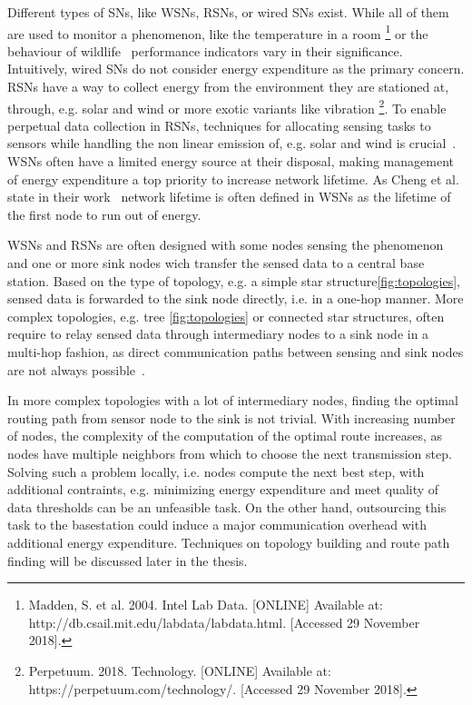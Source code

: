 Different types of \acp{SN}, like \acp{WSN}, \acp{RSN}, or wired \acp{SN} exist. 
While all of them are used to monitor a phenomenon, like the temperature in a room \footnote{Madden, S. et al. 2004. Intel Lab Data. [ONLINE] Available at: http://db.csail.mit.edu/labdata/labdata.html. [Accessed 29 November 2018].} or the behaviour of wildlife~\cite{bennett2011cranetracker} performance indicators vary in their significance. 
Intuitively, wired \acp{SN} do not consider energy expenditure as the primary concern. 
\acp{RSN} have a way to collect energy from the environment they are stationed at, through, e.g. solar and wind or more exotic variants like vibration \footnote{Perpetuum. 2018. Technology. 
[ONLINE] Available at: https://perpetuum.com/technology/. [Accessed 29 November 2018].}. 
To enable perpetual data collection in \acp{RSN}, techniques for allocating sensing tasks to sensors while handling the non linear emission of, e.g. solar and wind is crucial~\cite{liu2011perpetual}. 
\acp{WSN} often have a limited energy source at their disposal, making management of energy expenditure a top priority to increase network lifetime. 
As Cheng et al. state in their work~\cite{cheng2013stcdg} network lifetime is often defined in \acp{WSN} as the lifetime of the first node to run out of energy. \par
\acp{WSN} and \acp{RSN} are often designed with some nodes sensing the phenomenon and one or more sink nodes wich transfer the sensed data to a central base station. 
Based on the type of topology, e.g. a simple star structure\ref{fig:topologies}, sensed data is forwarded to the sink node directly, i.e. in a one-hop manner. 
More complex topologies, e.g. tree \ref{fig:topologies} or connected star structures, often require to relay sensed data through intermediary nodes to a sink node in a multi-hop fashion, as direct communication paths between sensing and sink nodes are not always possible~\cite{romer2004design}. \par
In more complex topologies with a lot of intermediary nodes, finding the optimal routing path from sensor node to the sink is not trivial. 
With increasing number of nodes, the complexity of the computation of the optimal route increases, as nodes have multiple neighbors from which to choose the next transmission step. 
Solving such a problem locally, i.e. nodes compute the next best step, with additional contraints, e.g. minimizing energy expenditure and meet quality of data thresholds can be an unfeasible task. 
On the other hand, outsourcing this task to the basestation could induce a major communication overhead with additional energy expenditure.
Techniques on topology building and route path finding will be discussed later in the thesis.

